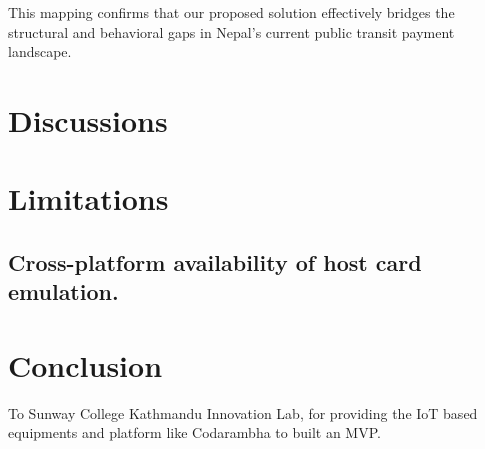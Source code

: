 \documentclass[manuscript,review,anonymous]{acmart}
\begin{document}
This mapping confirms that our proposed solution effectively bridges the structural and behavioral gaps in Nepal’s current public transit payment landscape.


\section{Discussions}


\section{Limitations}
\subsection{Cross-platform availability of host card emulation.}

\section{Conclusion}




\begin{acks}
To Sunway College Kathmandu Innovation Lab, for providing the IoT based equipments and platform like Codarambha to built an MVP.
\end{acks}




\appendix



\end{document}
